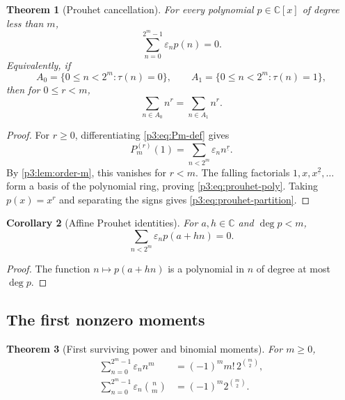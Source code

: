 \documentclass[11pt,oneside]{article}
\newtheorem{theorem}{Theorem}[section]
\newtheorem{corollary}[theorem]{Corollary}
\theoremstyle{definition}
\theoremstyle{remark}
\newcommand{\C}{\mathbb C}
\newcommand{\eps}{\varepsilon}
\newcommand{\fall}[2]{#1^{\underline{#2}}}
\newcommand{\1}{\mathbf 1}
\begin{document}
\begin{theorem}[Prouhet cancellation]
\label{p3:thm:prouhet}
For every polynomial \(p\in\C[x]\) of degree less than \(m\),
\begin{equation}
 \boxed{
 \sum_{n=0}^{2^m-1}\eps_np(n)=0.}
 \label{p3:eq:prouhet-poly}
\end{equation}
Equivalently, if
\[
 A_0=\{0\le n<2^m:\tau(n)=0\},
 \qquad
 A_1=\{0\le n<2^m:\tau(n)=1\},
\]
then for \(0\le r<m\),
\begin{equation}
 \sum_{n\in A_0}n^r=\sum_{n\in A_1}n^r.
 \label{p3:eq:prouhet-partition}
\end{equation}
\end{theorem}

\begin{proof}
For \(r\ge0\), differentiating \eqref{p3:eq:Pm-def} gives
\[
 P_m^{(r)}(1)=\sum_{n<2^m}\eps_n\fall nr.
\]
By \cref{p3:lem:order-m}, this vanishes for \(r<m\).  The falling factorials
\(1,x,\fall x2,\ldots\) form a basis of the polynomial ring, proving
\eqref{p3:eq:prouhet-poly}.  Taking \(p(x)=x^r\) and separating the signs gives
\eqref{p3:eq:prouhet-partition}.
\end{proof}

\begin{corollary}[Affine Prouhet identities]
\label{p3:cor:affine-prouhet}
For \(a,h\in\C\) and \(\deg p<m\),
\begin{equation}
 \sum_{n<2^m}\eps_np(a+hn)=0.
 \label{p3:eq:affine-prouhet}
\end{equation}
\end{corollary}

\begin{proof}
The function \(n\mapsto p(a+hn)\) is a polynomial in \(n\) of degree at most \(\deg p\).
\end{proof}

\subsection{The first nonzero moments}

\begin{theorem}[First surviving power and binomial moments]
\label{p3:thm:first-moment}
For \(m\ge0\),
\begin{align}
 \sum_{n=0}^{2^m-1}\eps_n n^m
 &=(-1)^m m!\,2^{\binom m2},                              \label{p3:eq:first-power-moment}\\
 \sum_{n=0}^{2^m-1}\eps_n\binom nm
 &=(-1)^m2^{\binom m2}.                                   \label{p3:eq:first-binomial-moment}
\end{align}
\end{theorem}
\end{document}
